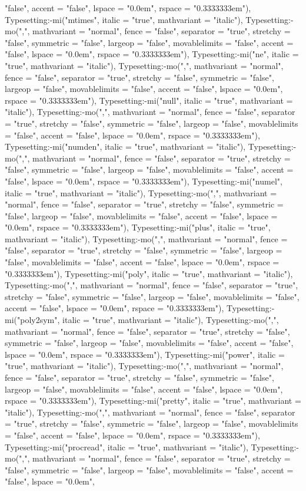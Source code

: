 \documentclass{article}
\begin{document}
{{{\begin{maplegroup}
\begin{maplelatex}
"false", accent = "false", lspace = "0.0em", rspace = "0.3333333em"), Typesetting:-mi("mtimes", italic = "true", mathvariant = "italic"), Typesetting:-mo(",", mathvariant = "normal", fence = "false", separator = "true", stretchy = "false", symmetric = "false", largeop = "false", movablelimits = "false", accent = "false", lspace = "0.0em", rspace = "0.3333333em"), Typesetting:-mi("ne", italic = "true", mathvariant = "italic"), Typesetting:-mo(",", mathvariant = "normal", fence = "false", separator = "true", stretchy = "false", symmetric = "false", largeop = "false", movablelimits = "false", accent = "false", lspace = "0.0em", rspace = "0.3333333em"), Typesetting:-mi("null", italic = "true", mathvariant = "italic"), Typesetting:-mo(",", mathvariant = "normal", fence = "false", separator = "true", stretchy = "false", symmetric = "false", largeop = "false", movablelimits = "false", accent = "false", lspace = "0.0em", rspace = "0.3333333em"), Typesetting:-mi("numden", italic = "true", mathvariant = "italic"), Typesetting:-mo(",", mathvariant = "normal", fence = "false", separator = "true", stretchy = "false", symmetric = "false", largeop = "false", movablelimits = "false", accent = "false", lspace = "0.0em", rspace = "0.3333333em"), Typesetting:-mi("numel", italic = "true", mathvariant = "italic"), Typesetting:-mo(",", mathvariant = "normal", fence = "false", separator = "true", stretchy = "false", symmetric = "false", largeop = "false", movablelimits = "false", accent = "false", lspace = "0.0em", rspace = "0.3333333em"), Typesetting:-mi("plus", italic = "true", mathvariant = "italic"), Typesetting:-mo(",", mathvariant = "normal", fence = "false", separator = "true", stretchy = "false", symmetric = "false", largeop = "false", movablelimits = "false", accent = "false", lspace = "0.0em", rspace = "0.3333333em"), Typesetting:-mi("poly", italic = "true", mathvariant = "italic"), Typesetting:-mo(",", mathvariant = "normal", fence = "false", separator = "true", stretchy = "false", symmetric = "false", largeop = "false", movablelimits = "false", accent = "false", lspace = "0.0em", rspace = "0.3333333em"), Typesetting:-mi("poly2sym", italic = "true", mathvariant = "italic"), Typesetting:-mo(",", mathvariant = "normal", fence = "false", separator = "true", stretchy = "false", symmetric = "false", largeop = "false", movablelimits = "false", accent = "false", lspace = "0.0em", rspace = "0.3333333em"), Typesetting:-mi("power", italic = "true", mathvariant = "italic"), Typesetting:-mo(",", mathvariant = "normal", fence = "false", separator = "true", stretchy = "false", symmetric = "false", largeop = "false", movablelimits = "false", accent = "false", lspace = "0.0em", rspace = "0.3333333em"), Typesetting:-mi("pretty", italic = "true", mathvariant = "italic"), Typesetting:-mo(",", mathvariant = "normal", fence = "false", separator = "true", stretchy = "false", symmetric = "false", largeop = "false", movablelimits = "false", accent = "false", lspace = "0.0em", rspace = "0.3333333em"), Typesetting:-mi("procread", italic = "true", mathvariant = "italic"), Typesetting:-mo(",", mathvariant = "normal", fence = "false", separator = "true", stretchy = "false", symmetric = "false", largeop = "false", movablelimits = "false", accent = "false", lspace = "0.0em", 
\end{maplelatex}
\end{maplegroup}}}}
\end{document}
